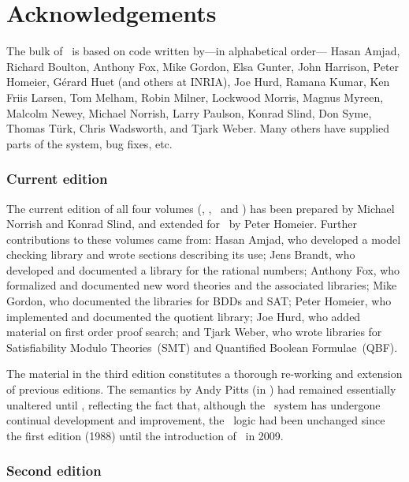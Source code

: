 \chapter*{Acknowledgements}

The bulk of \HOLW\ is based on code written by---in alphabetical
order---%
Hasan Amjad,
Richard Boulton,
Anthony Fox,
Mike Gordon,
Elsa Gunter,
John Harrison,
Peter Homeier,
G\'erard Huet (and others at INRIA),
Joe Hurd,
Ramana Kumar,
Ken Friis Larsen,
Tom Melham,
Robin Milner,
Lockwood Morris,
Magnus Myreen,
Malcolm Newey,
Michael Norrish,
Larry Paulson,
Konrad Slind,
Don Syme,
Thomas T\"urk,
Chris Wadsworth,
and
Tjark Weber.
Many others have supplied parts of the system, bug fixes, etc.

\subsection*{Current edition}

The current edition of all four volumes (\LOGIC, \TUTORIAL,
\DESCRIPTION\ and \REFERENCE) has been prepared by Michael Norrish and
Konrad Slind, and extended for \HOLW\ 
by Peter Homeier.
Further contributions to these volumes came from: Hasan
Amjad, who developed a model checking library and wrote sections
describing its use; Jens Brandt, who developed and documented a
library for the rational numbers; Anthony Fox, who formalized and
documented new word theories and the associated libraries; Mike
Gordon, who documented the libraries for BDDs and SAT; Peter Homeier,
who implemented and documented the quotient library; Joe Hurd, who
added material on first order proof search; and Tjark Weber, who wrote
libraries for Satisfiability Modulo Theories~(SMT) and Quantified
Boolean Formulae~(QBF).

\medskip

The material in the third edition constitutes a thorough re-working
and extension of previous editions.  The semantics by Andy Pitts (in \LOGIC)
had remained essentially unaltered until \HOLW, reflecting the fact
that, although the \HOL\ system has undergone continual development
and improvement, the \HOL\ logic had been unchanged since the first edition
(1988) until the introduction of \HOLW\ in 2009.

\newpage

\subsection*{Second edition}

